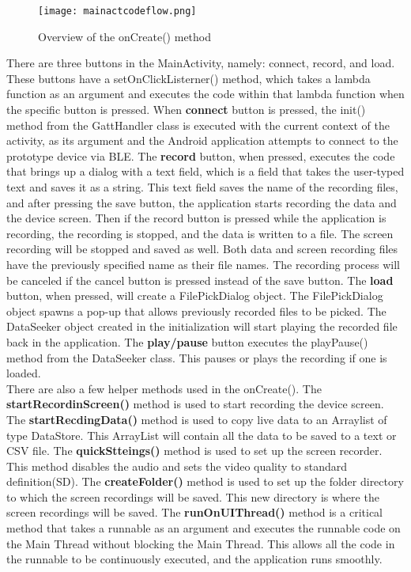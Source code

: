   \begin{figure}[!htb]
    \centering
    \texttt{[image: mainactcodeflow.png]}
    \caption{Overview of the onCreate() method }
    \label{fig:customtable}
  \end{figure}
  
There are three buttons in the MainActivity, namely: connect, record, and load. These buttons have a setOnClickListerner() method, which takes a lambda function as an argument and executes the code within that lambda function when the specific button is pressed. When \textbf{connect} button is pressed, the init() method from the GattHandler class is executed with the current context of the activity, as its argument and the Android application attempts to connect to the prototype device via BLE. The \textbf{record} button, when pressed, executes the code that brings up a dialog with a text field, which is a field that takes the user-typed text and saves it as a string. This text field saves the name of the recording files, and after pressing the save button, the application starts recording the data and the device screen. Then if the record button is pressed while the application is recording, the recording is stopped, and the data is written to a file. The screen recording will be stopped and saved as well. Both data and screen recording files have the previously specified name as their file names. The recording process will be canceled if the cancel button is pressed instead of the save button. The \textbf{load} button, when pressed, will create a FilePickDialog object. The FilePickDialog object spawns a pop-up that allows previously recorded files to be picked. The DataSeeker object created in the initialization will start playing the recorded file back in the application. The \textbf{play/pause} button executes the playPause() method from the DataSeeker class. This pauses or plays the recording if one is loaded.\\
There are also a few helper methods used in the onCreate().
The \textbf{startRecordinScreen()} method is used to start recording the device screen.
The \textbf{startRecdingData()} method is used to copy live data to an Arraylist of type DataStore. This ArrayList will contain all the data to be saved to a text or CSV file.
The \textbf{quickStteings()} method is used to set up the screen recorder. This method disables the audio and sets the video quality to standard definition(SD).
The \textbf{createFolder()} method is used to set up the folder directory to which the screen recordings will be saved. This new directory is where the screen recordings will be saved.
The \textbf{runOnUIThread()} method is a critical method that takes a runnable as an argument and executes the runnable code on the Main Thread without blocking the Main Thread. This allows all the code in the runnable to be continuously executed, and the application runs smoothly.


